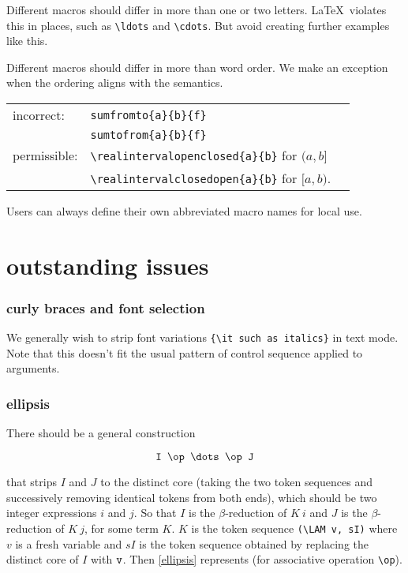 \documentclass[12pt]{amsart}
\begin{document}
Different macros should differ in more than one or two letters.
\LaTeX\ violates this in places, such as \verb!\ldots! and \verb!\cdots!.
But avoid creating further examples like this.

Different macros should differ in more than word order.
We make an exception when the ordering aligns with the semantics.

\begin{tabular}{lll}
 incorrect: &\verb!sumfromto{a}{b}{f}!\\ &\verb!sumtofrom{a}{b}{f}!\\
 permissible: &\verb!\realintervalopenclosed{a}{b}! for $(a,b]$\\
    &\verb!\realintervalclosedopen{a}{b}! for $[a,b)$.
\end{tabular} 

Users can always define their own abbreviated macro names for local use.


\section{outstanding issues}



\subsubsection{curly braces and font selection}



We generally wish to strip font variations \verb!{\it such as italics}! in
text mode.  Note that this doesn't fit the usual pattern of control sequence applied
to arguments.




\subsubsection{ellipsis}

There should be a general construction 

\begin{equation}\label{ellipsis}
\verb!I \op \dots \op J!   
\end{equation}

that strips $I$ and $J$ to the distinct core (taking the two token sequences and successively removing identical tokens from
both ends), which should be two integer expressions $i$ and $j$.
So that $I$ is the $\beta$-reduction of $K\ i$ and $J$ is the $\beta$-reduction of $K\ j$, for some
term $K$.  $K$ is the token sequence  \verb!(\LAM v, sI)! where $v$ is a fresh variable and $sI$ is the token sequence
obtained by replacing the distinct core of $I$ with $\verb!v!$.
Then \eqref{ellipsis} represents (for associative operation \verb!\op!).
\end{document}
